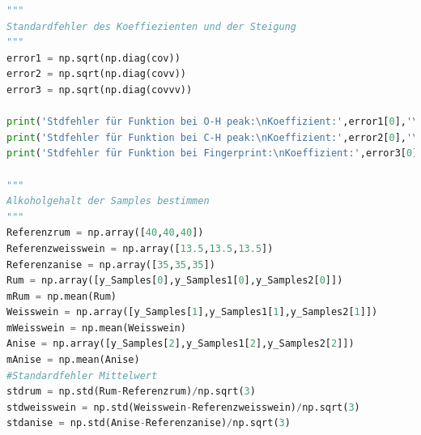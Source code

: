 \documentclass[a4paper,abstracton]{article}	                       %
\begin{document}
\begin{lstlisting}[language=Python]
"""
Standardfehler des Koeffiezienten und der Steigung
"""
error1 = np.sqrt(np.diag(cov))
error2 = np.sqrt(np.diag(covv))
error3 = np.sqrt(np.diag(covvv))

print('Stdfehler für Funktion bei O-H peak:\nKoeffizient:',error1[0],'\n','Steigung:',error1[1])
print('Stdfehler für Funktion bei C-H peak:\nKoeffizient:',error2[0],'\n','Steigung:',error2[1])
print('Stdfehler für Funktion bei Fingerprint:\nKoeffizient:',error3[0],'\n','Steigung:',error3[1])

"""
Alkoholgehalt der Samples bestimmen
"""
Referenzrum = np.array([40,40,40])
Referenzweisswein = np.array([13.5,13.5,13.5])
Referenzanise = np.array([35,35,35])
Rum = np.array([y_Samples[0],y_Samples1[0],y_Samples2[0]])
mRum = np.mean(Rum)
Weisswein = np.array([y_Samples[1],y_Samples1[1],y_Samples2[1]])
mWeisswein = np.mean(Weisswein)
Anise = np.array([y_Samples[2],y_Samples1[2],y_Samples2[2]])
mAnise = np.mean(Anise)
#Standardfehler Mittelwert
stdrum = np.std(Rum-Referenzrum)/np.sqrt(3)
stdweisswein = np.std(Weisswein-Referenzweisswein)/np.sqrt(3)
stdanise = np.std(Anise-Referenzanise)/np.sqrt(3)
\end{lstlisting}
\clearpage
\end{document}
